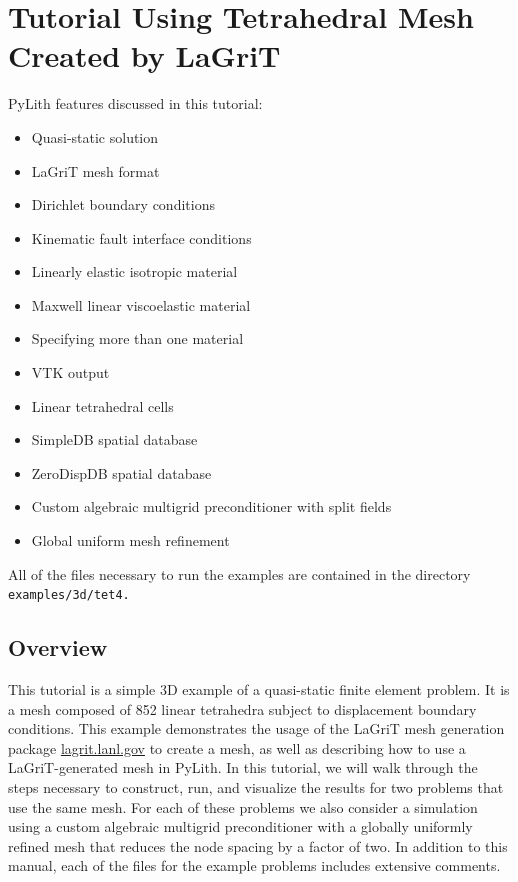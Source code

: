 
\section{\label{sec:Tutorial-3d-tet4}Tutorial Using Tetrahedral Mesh Created
by LaGriT}

PyLith features discussed in this tutorial:
\begin{itemize}
\item Quasi-static solution
\item LaGriT mesh format
\item Dirichlet boundary conditions
\item Kinematic fault interface conditions
\item Linearly elastic isotropic material
\item Maxwell linear viscoelastic material
\item Specifying more than one material
\item VTK output
\item Linear tetrahedral cells
\item SimpleDB spatial database
\item ZeroDispDB spatial database
\item Custom algebraic multigrid preconditioner with split fields
\item Global uniform mesh refinement
\end{itemize}
All of the files necessary to run the examples are contained in the
directory \texttt{examples/3d/tet4.}


\subsection{Overview}

This tutorial is a simple 3D example of a quasi-static finite element
problem. It is a mesh composed of 852 linear tetrahedra subject to
displacement boundary conditions. This example demonstrates the usage
of the LaGriT mesh generation package \url{lagrit.lanl.gov} to create
a mesh, as well as describing how to use a LaGriT-generated mesh in
PyLith. In this tutorial, we will walk through the steps necessary
to construct, run, and visualize the results for two problems that
use the same mesh. For each of these problems we also consider a simulation
using a custom algebraic multigrid preconditioner with a globally
uniformly refined mesh that reduces the node spacing by a factor of
two. In addition to this manual, each of the files for the example
problems includes extensive comments.


